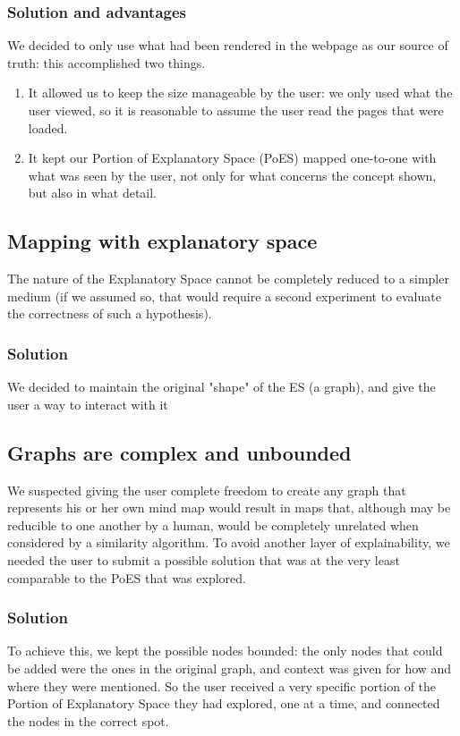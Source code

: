 \documentclass{article}
\begin{document}
\subsubsection{Solution and advantages}
We decided to only use what had been rendered in the webpage as our source of truth: this accomplished two things.
\begin{enumerate}
    \item It allowed us to keep the size manageable by the user: we only used what the user viewed, so it is reasonable to assume the user read the pages that were loaded.
    \item It kept our Portion of Explanatory Space (PoES) mapped one-to-one with what was seen by the user, not only for what concerns the concept shown, but also in what detail.
\end{enumerate}

\subsection{Mapping with explanatory space}
The nature of the Explanatory Space cannot be completely reduced to a simpler medium (if we assumed so, that would require a second experiment to evaluate the correctness of such a hypothesis).
\subsubsection{Solution}
We decided to maintain the original "shape" of the ES (a graph), and give the user a way to interact with it

\subsection{Graphs are complex and unbounded}
We suspected giving the user complete freedom to create any graph that represents his or her own mind map would result in maps that, although may be reducible to one another by a human, would be completely unrelated when considered by a similarity algorithm. To avoid another layer of explainability, we needed the user to submit a possible solution that was at the very least comparable to the PoES that was explored.
\subsubsection{Solution}
To achieve this, we kept the possible nodes bounded: the only nodes that could be added were the ones in the original graph, and context was given for how and where they were mentioned. So the user received a very specific portion of the Portion of Explanatory Space they had explored, one at a time, and connected the nodes in the correct spot.
\end{document}
